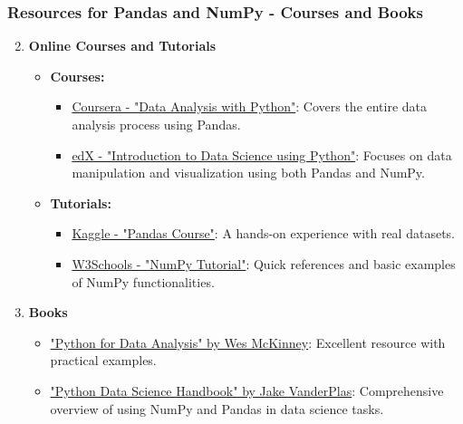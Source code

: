 \documentclass[aspectratio=169]{beamer}
\begin{document}
\begin{frame}[fragile]
    \frametitle{Resources for Pandas and NumPy - Courses and Books}
    \begin{enumerate}
        \setcounter{enumi}{1}
        \item \textbf{Online Courses and Tutorials}
        \begin{itemize}
            \item \textbf{Courses:}
            \begin{itemize}
                \item \underline{Coursera - "Data Analysis with Python"}: Covers the entire data analysis process using Pandas.
                \item \underline{edX - "Introduction to Data Science using Python"}: Focuses on data manipulation and visualization using both Pandas and NumPy.
            \end{itemize}
            \item \textbf{Tutorials:}
            \begin{itemize}
                \item \underline{Kaggle - "Pandas Course"}: A hands-on experience with real datasets.
                \item \underline{W3Schools - "NumPy Tutorial"}: Quick references and basic examples of NumPy functionalities.
            \end{itemize}
        \end{itemize}
        
        \item \textbf{Books}
        \begin{itemize}
            \item \underline{"Python for Data Analysis" by Wes McKinney}: Excellent resource with practical examples.
            \item \underline{"Python Data Science Handbook" by Jake VanderPlas}: Comprehensive overview of using NumPy and Pandas in data science tasks.
        \end{itemize}
    \end{enumerate}
\end{frame}
\end{document}
